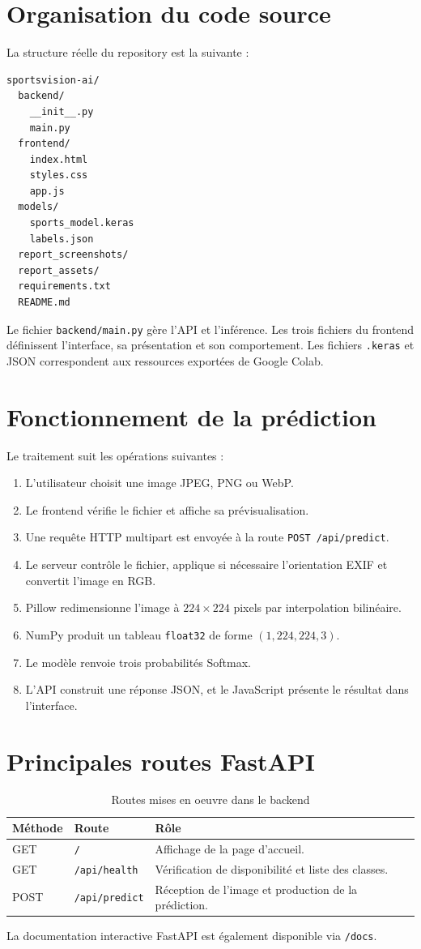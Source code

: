 \documentclass[11pt,a4paper,oneside]{report}
\begin{document}
\section{Organisation du code source}
La structure réelle du repository est la suivante :
\begin{lstlisting}
sportsvision-ai/
  backend/
    __init__.py
    main.py
  frontend/
    index.html
    styles.css
    app.js
  models/
    sports_model.keras
    labels.json
  report_screenshots/
  report_assets/
  requirements.txt
  README.md
\end{lstlisting}
Le fichier \texttt{backend/main.py} gère l'API et l'inférence. Les trois fichiers du frontend définissent l'interface, sa présentation et son comportement. Les fichiers \texttt{.keras} et JSON correspondent aux ressources exportées de Google Colab.
\section{Fonctionnement de la prédiction}
Le traitement suit les opérations suivantes :
\begin{enumerate}
\item L'utilisateur choisit une image JPEG, PNG ou WebP.
\item Le frontend vérifie le fichier et affiche sa prévisualisation.
\item Une requête HTTP multipart est envoyée à la route \texttt{POST /api/predict}.
\item Le serveur contrôle le fichier, applique si nécessaire l'orientation EXIF et convertit l'image en RGB.
\item Pillow redimensionne l'image à $224\times224$ pixels par interpolation bilinéaire.
\item NumPy produit un tableau \texttt{float32} de forme $(1,224,224,3)$.
\item Le modèle renvoie trois probabilités Softmax.
\item L'API construit une réponse JSON, et le JavaScript présente le résultat dans l'interface.
\end{enumerate}
\section{Principales routes FastAPI}
\begin{table}[H]\centering
\caption{Routes mises en oeuvre dans le backend}
\begin{tabularx}{\textwidth}{llX}
\toprule
\textbf{Méthode}&\textbf{Route}&\textbf{Rôle}\\
\midrule
GET&\texttt{/}&Affichage de la page d'accueil.\\
GET&\texttt{/api/health}&Vérification de disponibilité et liste des classes.\\
POST&\texttt{/api/predict}&Réception de l'image et production de la prédiction.\\
\bottomrule
\end{tabularx}
\end{table}
La documentation interactive FastAPI est également disponible via \texttt{/docs}.
\end{document}
